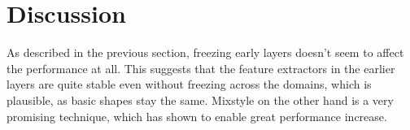\section{Discussion}

As described in the previous section, freezing early layers doesn't seem to affect the performance at all. This suggests that the feature extractors in the earlier layers are quite stable even without freezing across the domains, which is plausible, as basic shapes stay the same. Mixstyle on the other hand is a very promising technique, which has shown to enable great performance increase.